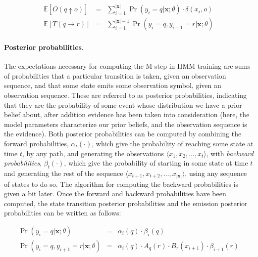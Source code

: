 \begin{eqnarray}
\label{eq:chapter6_ex1} \mathbb{E}[O(q \uparrow o)]& =& \sum_{i=1}^{|\textbf{x}|} \Pr(y_i = q | \textbf{x}; \theta) \cdot \delta(x_i,o) \\
\label{eq:chapter6_ex1a} \mathbb{E}[T(q \rightarrow r)] & = & \sum_{i=1}^{|\textbf{x}|-1} \Pr(y_i = q , y_{i+1} = r | \textbf{x}; \theta)
\end{eqnarray}

\paragraph{\bf Posterior probabilities.}

The expectations necessary for computing the M-step in HMM training
are sums of probabilities that a particular transition is taken, given
an observation sequence, and that some state emits some observation
symbol, given an observation sequence.  These are referred to as
posterior probabilities, indicating that they are the probability of
some event whose distribution we have a prior belief about, after
addition evidence has been taken into consideration (here, the model
parameters characterize our prior beliefs, and the observation
sequence is the evidence).  Both posterior probabilities can be
computed by combining the forward probabilities, $\alpha_t(\cdot)$,
which give the probability of reaching some state at time $t$, by any
path, and generating the observations $\langle x_1, x_2, \ldots , x_t
\rangle$, with \emph{backward probabilities}, $\beta_t(\cdot)$, which
give the probability of starting in some state at time $t$ and
generating the rest of the sequence $\langle x_{t+1}, x_{t+2}, \ldots
, x_{|\textbf{x}|} \rangle$, using any sequence of states to do so.
The algorithm for computing the backward probabilities is given a bit
later.  Once the forward and backward probabilities have been
computed, the state transition posterior probabilities and the
emission posterior probabilities can be written as follows:

\begin{eqnarray}
\label{eq:chapter6_stateocprob} \Pr(y_i = q | \textbf{x}; \theta) & = & \alpha_i(q) \cdot \beta_i(q) \\
\Pr(y_i = q , y_{i+1} = r | \textbf{x}; \theta) & = & \alpha_i(q) \cdot A_q(r) \cdot B_r(x_{i+1}) \cdot \beta_{i+1}(r) \label{eq:chapter6_transprob}
\end{eqnarray}

